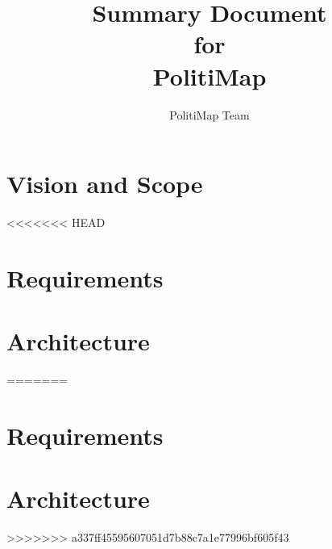 \documentclass[12pt,oneside,letterpaper]{article}
\title{Summary Document\\\large for\\\Large PolitiMap}
\author{PolitiMap Team}
\begin{document}
\thispagestyle{empty}\maketitle
\tableofcontents

\section{Vision and Scope}
<<<<<<< HEAD


\section{Requirements}


\section{Architecture}

=======


\section{Requirements}


\section{Architecture}

>>>>>>> a337ff45595607051d7b88c7a1e77996bf605f43
\end{document}
